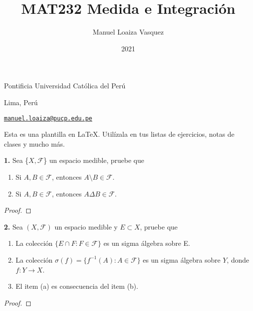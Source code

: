 \documentclass{article}
\title{MAT232 Medida e Integraci\'on}
\author{Manuel Loaiza Vasquez}
\date{2021}
\newenvironment{statement}[1]{\smallskip\noindent\color[rgb]{1.00,0.00,0.50} {\bf #1.}}{}
\theoremstyle{definition}
\theoremstyle{remark}
\begin{document}
\maketitle

\vspace*{-0.25in}
\centerline{Pontificia Universidad Cat\'olica del Per\'u}
\centerline{Lima, Per\'u}
\centerline{\href{mailto:manuel.loaiza@pucp.edu.pe}{{\tt manuel.loaiza@pucp.edu.pe}}}
\vspace*{0.15in}

\begin{framed}
  Esta es una plantilla en \LaTeX. Util\'izala en tus listas de ejercicios, notas de clases y mucho m\'as.
\end{framed}

\begin{statement}{1}
  Sea \{$X, \mathcal{F}$\} un espacio medible, pruebe que
  \begin{enumerate}
    \item Si $A, B \in \mathcal{F}$, entonces $A \setminus B \in \mathcal{F}$.
    \item Si $A, B \in \mathcal{F}$, entonces $A \Delta B \in \mathcal{F}$.
  \end{enumerate}
\end{statement}

\begin{proof}
\end{proof}

\begin{statement}{2}
  Sea $(X, \mathcal{F})$ un espacio medible y $E \subset X$, pruebe que
  \begin{enumerate}
    \item La colecci\'on $\{E \cap F : F \in \mathcal{F}\}$ es un sigma \'algebra sobre E.
    \item La colecci\'on $\sigma(f) = \{f^{-1}(A) : A \in \mathcal{F}\}$ es un sigma \'algebra sobre $Y$, donde $f: Y \to X$.
    \item El item (a) es consecuencia del item (b).
  \end{enumerate}
\end{statement}

\begin{proof}
\end{proof}
\end{document}
